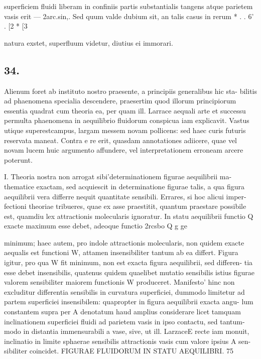 \documentclass[12pt,a4paper]{article}
\begin{document}
superficiem fluidi liberam in confiniis partis substantialis tangens atque parietem
vasis erit ---         2arc.sin,.         Sed quum         valde dubium sit, an talis casus in rerum
*        .             .    6'                                      .        [2          *         [3




natura exstet,         superfluum videtur,          diutius ei immorari.



\subsection*{34.}

Alienum foret ab instituto nostro praesente, a principiis generalibus hic sta-
bilitis ad phaenomena specialia descendere, praesertim quod illorum principiorum
essentia quadrat cum theoria ea, per quam ill. Larrace aequali arte et successu
permulta phaenomena in aequilibrio fluidorum conspicua iam explicavit. Vastus
utique superestcampus, largam messem novam pollicens: sed haec curis futuris
reservata maneat.  Contra e re erit, quasdam annotationes adiicere, quae vel
novam lucem huic argumento affundere, vel interpretationem erroneam arcere
poterunt.


I.       Theoria nostra non arrogat sibi'determinationem figurae aequilibrii ma-
thematice exactam,              sed acquiescit in determinatione                  figurae talis, a qua figura
aequilibrii vera differre nequit quantitate sensibili. Errares, si hoc alicui imper-
fectioni theoriae tribueres, quae ex asse praestitit, quantum praestare possibile
est, quamdiu lex attractionis molecularis ignoratur. In statu aequilibrii functio
Q exacte maximum esse debet, adeoque functio
2rcsbo        Q
g           ge

minimum;           haec autem,        pro indole attractionis molecularis,                  non quidem exacte
aequalis est functioni            W,     attamen insensibiliter tantum ab ea differt.                        Figura
igitur, pro qua W fit minimum, non est exacta figura aequilibrii, sed differen-
tia esse debet insensibilis, quatenus quidem quaelibet mutatio sensibilis istius
figurae valorem sensibiliter maiorem functionis                          W produceret.            Manifesto' hinc
non excluditur differentia sensibilis in curvatura                           superficiei,   dummodo     limitetur
ad partem superficiei insensibilem: quapropter in figura aequilibrii exacta angu-
lum constantem supra per A denotatum haud amplius considerare licet tamquam
inclinationem superficiei fluidi ad parietem vasis in ipso contactu, sed tantum-
modo in distantia immensurabili                a vase,         sive, ut ill. LarzaceE recte iam monuit,
inclinatio in limite sphaerae sensibilis attractionis vasis cum valore ipsius A sen-
sibiliter coincidet.
FIGURAE FLUIDORUM IN STATU AEQUILIBRI.                     75
\end{document}
